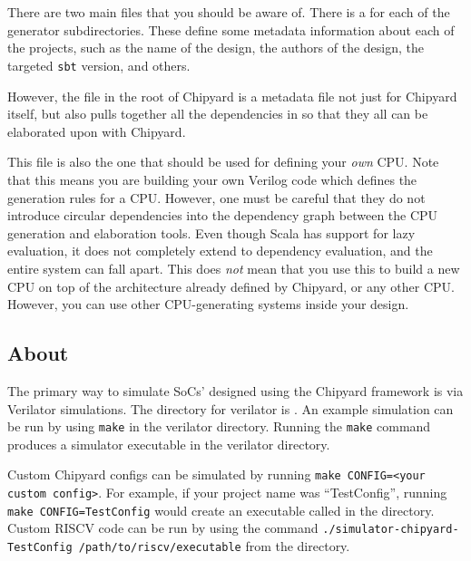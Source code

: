 \section{}\label{sec:build.sbt}
There are two main  files that you should be aware of.
There is a  for each of the generator subdirectories.
These define some metadata information about each of the projects, such as the name of the design, the authors of the design, the targeted \texttt{sbt} version, and others.

However, the  file in the root of Chipyard is a metadata file not just for Chipyard itself, but also pulls together all the dependencies in  so that they all can be elaborated upon with Chipyard.

This file is also the one that should be used for defining your \emph{own} CPU.\@
Note that this means you are building your own Verilog code which defines the generation rules for a CPU.\@
However, one must be careful that they do not introduce circular dependencies into the dependency graph between the CPU generation and elaboration tools.
Even though Scala has support for lazy evaluation, it does not completely extend to dependency evaluation, and the entire system can fall apart.
This does \emph{not} mean that you use this to build a new CPU on top of the architecture already defined by Chipyard, or any other CPU.\@
However, you can use other CPU-generating systems inside your design.

\subsection{About}\label{sec:About_Verilator_Simulator}
The primary way to simulate SoCs' designed using the Chipyard framework is via Verilator simulations.
The directory for verilator is .
An example simulation can be run by using \texttt{make} in the verilator directory.
Running the \texttt{make} command produces a simulator executable in the verilator directory.

Custom Chipyard configs can be simulated by running \texttt{make CONFIG=<your custom config>}.
For example, if your project name was ``TestConfig'', running \texttt{make CONFIG=TestConfig} would create an executable called  in the  directory.
Custom RISCV code can be run by using the command \texttt{./simulator-chipyard-TestConfig /path/to/riscv/executable} from the  directory.

